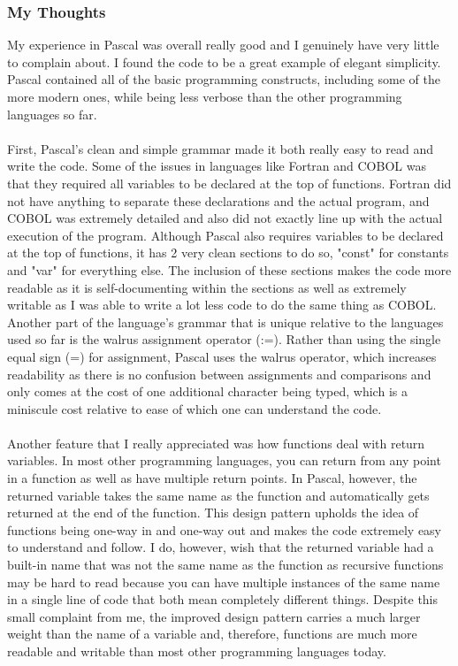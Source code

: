 \documentclass[letterpaper, 10pt, DIV=13]{scrartcl}
\numberwithin{equation}{section}
\numberwithin{figure}{section}
\numberwithin{table}{section}
\begin{document}
\subsubsection{My Thoughts}
My experience in Pascal was overall really good and I genuinely have very little to complain about. I found the code to be a great example of elegant simplicity. Pascal contained all of the basic programming constructs, including some of the more modern ones, while being less verbose than the other programming languages so far.
\\ \\
First, Pascal's clean and simple grammar made it both really easy to read and write the code. Some of the issues in languages like Fortran and COBOL was that they required all variables to be declared at the top of functions. Fortran did not have anything to separate these declarations and the actual program, and COBOL was extremely detailed and also did not exactly line up with the actual execution of the program. Although Pascal also requires variables to be declared at the top of functions, it has 2 very clean sections to do so, "const" for constants and "var" for everything else. The inclusion of these sections makes the code more readable as it is self-documenting within the sections as well as extremely writable as I was able to write a lot less code to do the same thing as COBOL. Another part of the language's grammar that is unique relative to the languages used so far is the walrus assignment operator (:=). Rather than using the single equal sign (=) for assignment, Pascal uses the walrus operator, which increases readability as there is no confusion between assignments and comparisons and only comes at the cost of one additional character being typed, which is a miniscule cost relative to ease of which one can understand the code.
\\ \\
Another feature that I really appreciated was how functions deal with return variables. In most other programming languages, you can return from any point in a function as well as have multiple return points. In Pascal, however, the returned variable takes the same name as the function and automatically gets returned at the end of the function. This design pattern upholds the idea of functions being one-way in and one-way out and makes the code extremely easy to understand and follow. I do, however, wish that the returned variable had a built-in name that was not the same name as the function as recursive functions may be hard to read because you can have multiple instances of the same name in a single line of code that both mean completely different things. Despite this small complaint from me, the improved design pattern carries a much larger weight than the name of a variable and, therefore, functions are much more readable and writable than most other programming languages today.
\end{document}

